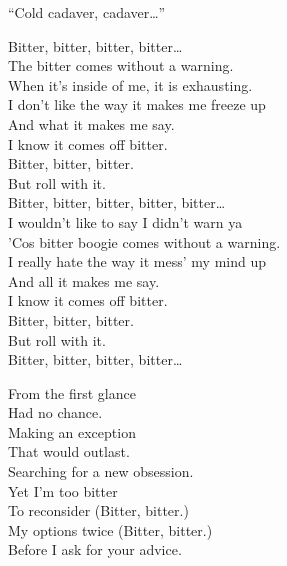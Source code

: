``Cold cadaver, cadaver…'' \\





Bitter, bitter, bitter, bitter… \\

The bitter  comes without a warning. \\
When it's inside of me, it is exhausting. \\
I don't like the way it makes me freeze up \\
And what it makes me say. \\

I know it comes off bitter. \\
Bitter, bitter, bitter. \\
But roll with it. \\

Bitter, bitter, bitter, bitter, bitter… \\

I wouldn't like to say I didn't warn ya \\
'Cos bitter boogie comes without a warning. \\
I really hate the way it mess' my mind up \\
And all it makes me say. \\

I know it comes off bitter. \\
Bitter, bitter, bitter. \\
But roll with it. \\

Bitter, bitter, bitter, bitter… \\


From the first glance \\
Had no chance. \\
Making an exception \\
That would outlast. \\
Searching for a new obsession. \\

Yet I'm too bitter \\
To reconsider (Bitter, bitter.) \\
My options twice (Bitter, bitter.) \\
Before I ask for your advice. \\

